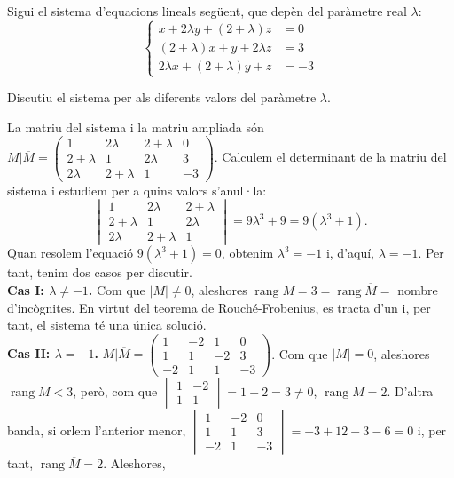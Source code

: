 Sigui el sistema d'equacions lineals següent, que depèn del paràmetre real $\lambda$:
\[
\left\{\begin{aligned}
x+2\lambda y+(2+\lambda)z&=0\\
(2+\lambda)x+y+2\lambda z&=3\\
2\lambda x+(2+\lambda)y+z&=-3
\end{aligned}\right.
\]

\begin{apartats}

Discutiu el sistema per als diferents valors del paràmetre $\lambda$.

\begin{solucio}
La matriu del sistema i la matriu ampliada són
$M|\overline{M}=\left(\begin{array}{ccc|c}1&2\lambda&2+\lambda&0\\2+\lambda&1&2\lambda&3\\2\lambda&2+\lambda&1&-3\end{array}\right)$.
Calculem el determinant de la matriu del sistema i estudiem per a quins valors s'anul·la:
\[
\begin{vmatrix}1&2\lambda&2+\lambda\\2+\lambda&1&2\lambda\\2\lambda&2+\lambda&1\end{vmatrix}=9\lambda^3+9=9\left(\lambda^3+1\right).
\]
Quan resolem l'equació $9\left(\lambda^3+1\right)=0$, obtenim $\lambda^3=-1$ i, d'aquí, $\lambda=-1$. Per tant, tenim dos
casos per discutir.\\
\textbf{Cas I: $\lambda\neq-1$.} Com que $|M|\neq0$, aleshores $\operatorname{rang}M=3=\operatorname{rang}\overline{M}=$ nombre
d'incògnites. En virtut del teorema de Rouché-Frobenius, es tracta d'un  i, per
tant, el sistema té una única solució.\\
\textbf{Cas II: $\lambda=-1$.}
$M|\overline{M}=\left(\begin{array}{ccc|c}1&-2&1&0\\1&1&-2&3\\-2&1&1&-3\end{array}\right)$. Com que $|M|=0$, aleshores
$\operatorname{rang}M<3$, però, com que $\begin{vmatrix}1&-2\\1&1\end{vmatrix}=1+2=3\neq0$, $\operatorname{rang}M=2$. D'altra
banda, si orlem l'anterior menor,
$\begin{vmatrix}1&-2&0\\1&1&3\\-2&1&-3\end{vmatrix}=-3+12-3-6=0$ i, per tant, $\operatorname{rang}\overline{M}=2$. Aleshores,

\end{solucio}
\end{apartats}
